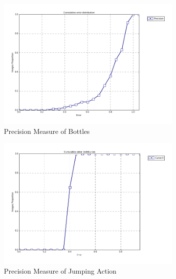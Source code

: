\begin{figure}[h!]
    \centering
    \begin{subfigure}[b]{0.1\textwidth}
            \includegraphics[width=\textwidth]{supports/Segmentation_Measure/bottle_seg}
        \caption{Precision Measure of Bottles}
    \end{subfigure}
    \qquad
    \begin{subfigure}[b]{0.1\textwidth}
            \includegraphics[width=\textwidth]{supports/Segmentation_Measure/body_jump_seg}
        \caption{Precision Measure of Jumping Action}
    \end{subfigure}
    \qquad
    \begin{subfigure}[b]{0.1\textwidth}

\end{subfigure}
\end{figure}
